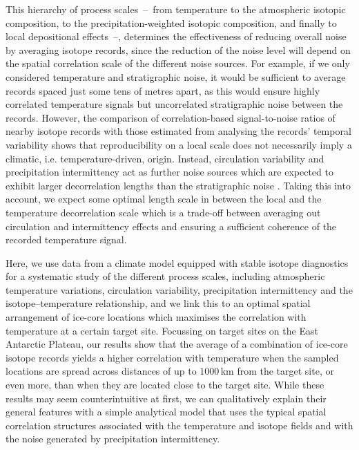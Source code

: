 \documentclass[cp, manuscript]{copernicus}
\begin{document}
This hierarchy of process scales~--~from temperature to the atmospheric isotopic
composition, to the precipitation-weighted isotopic composition, and finally to
local depositional effects~--, determines the effectiveness of reducing overall
noise by averaging isotope records, since the reduction of the noise level will
depend on the spatial correlation scale of the different noise sources. For
example, if we only considered temperature and stratigraphic noise, it would be
sufficient to average records spaced just some tens of metres apart, as this
would ensure highly correlated temperature signals but uncorrelated
stratigraphic noise between the records. However, the comparison of
correlation-based signal-to-noise ratios of nearby isotope records
\citep{Munch2016,Munch2017} with those estimated from analysing the records'
temporal variability \citep{Laepple2018} shows that reproducibility on a local
scale does not necessarily imply a climatic, i.e. temperature-driven,
origin. Instead, circulation variability and precipitation intermittency act as
further noise sources which are expected to exhibit larger decorrelation lengths
than the stratigraphic noise \citep{Laepple2018,Munch2018a}. Taking this into
account, we expect some optimal length scale in between the local and the
temperature decorrelation scale which is a trade-off between averaging out
circulation and intermittency effects and ensuring a sufficient coherence of the
recorded temperature signal.

Here, we use data from a climate model equipped with stable isotope diagnostics
for a systematic study of the different process scales, including atmospheric
temperature variations, circulation variability, precipitation intermittency
and the isotope--temperature relationship, and we link this to an optimal
spatial arrangement of ice-core locations which maximises the correlation with
temperature at a certain target site. Focussing on target sites on the East
Antarctic Plateau, our results show that the average of a combination of
ice-core isotope records yields a higher correlation with temperature when the
sampled locations are spread across distances of up to $1000$\,km from the
target site, or even more, than when they are located close to the target
site. While these results may seem counterintuitive at first, we can
qualitatively explain their general features with a simple analytical model that
uses the typical spatial correlation structures associated with the temperature
and isotope fields and with the noise generated by precipitation intermittency.
\end{document}
